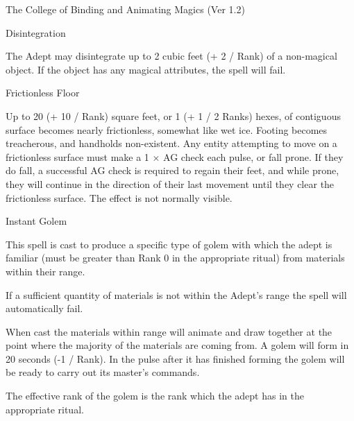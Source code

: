 \begin{Chapter}{The College of Binding and Animating Magics (Ver 1.2)}
\begin{spell}[S-2]{Disintegration}
\begin{effects}
The Adept may disintegrate up to 2 cubic feet (+ 2 / Rank) of a
non-magical object.  If the object has any magical attributes, the
spell will fail.
\end{effects}
\end{spell}

\begin{spell}[S-3]{Frictionless Floor}
\begin{effects}
Up to 20 (+ 10 / Rank) square feet, or 1 (+ 1 / 2 Ranks) hexes, of
contiguous surface becomes nearly frictionless, somewhat like wet
ice. Footing becomes treacherous, and handholds non-existent.  Any
entity attempting to move on a frictionless surface must make a 1 × AG
check each pulse, or fall prone. If they do fall, a successful AG
check is required to regain their feet, and while prone, they will
continue in the direction of their last movement until they clear the
frictionless surface.  The effect is not normally visible.
\end{effects}
\end{spell}

\begin{spell}[S-4]{Instant Golem}
\begin{effects}
This spell is cast to produce a specific type of golem with which the
adept is familiar (must be greater than Rank 0 in the appropriate
ritual) from materials within their range.

If a sufficient quantity of materials is not within the Adept’s range
the spell will automatically fail.

When cast the materials within range will animate and draw together at
the point where the majority of the materials are coming from.  A
golem will form in 20 seconds (-1 / Rank). In the pulse after it has
finished forming the golem will be ready to carry out its master’s
commands.

The effective rank of the golem is the rank which the adept has in the
appropriate ritual.


\end{effects}
\end{spell}
\end{Chapter}
